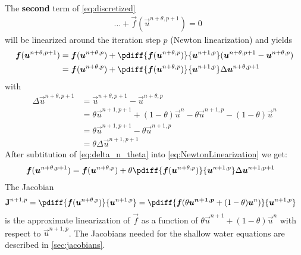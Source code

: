 The \textbf{second} term of \autoref{eq:discretized}
\begin{align}
    &\ldots +
    \vec{f} \left( \vec{u}^{n+\theta, p+1} \right) = 0
    \label{eq:second_term}
\end{align}
%
will be linearized around the iteration step $p$ (Newton linearization) and yields
\begin{align}
    \vec{f}( \vec{u}^{n+\theta, p+1} ) & = \vec{f}( \vec{u}^{n+\theta, p} ) + \pdiff{\vec{f}(\vec{u}^{n+\theta,p})}{\vec{u}^{n+1,p}} (\vec{u}^{n+\theta,p+1} - \vec{u}^{n+\theta,p})
    \\
    & = \vec{f}( \vec{u}^{n+\theta, p} ) + \pdiff{\vec{f}(\vec{u}^{n+\theta,p})}{\vec{u}^{n+1,p}} \Delta\vec{u}^{n+\theta,p+1} \label{eq:NewtonLinearization}
\end{align}
with
\begin{align}
    \Delta \vec{u}^{n+\theta, p+1} & = \vec{u}^{n+\theta, p+1} - \vec{u}^{n+\theta, p}
    \\
    & = \theta \vec{u}^{n+1, p+1} + (1-\theta) \vec{u}^{n} - \theta \vec{u}^{n+1, p} - (1-\theta) \vec{u}^{n}
    \\
    & = \theta \vec{u}^{n+1, p+1} - \theta \vec{u}^{n+1, p}
    \\
    &= \theta \Delta \vec{u}^{n+1, p+1} \label{eq:delta_n_theta}
\end{align}
After subtitution of \autoref{eq:delta_n_theta} into \autoref{eq:NewtonLinearization} we get:
\begin{align}
    \vec{f}( \vec{u}^{n+\theta, p+1} ) & = \vec{f}( \vec{u}^{n+\theta, p} ) + \theta \pdiff{\vec{f}(\vec{u}^{n+\theta,p})}{\vec{u}^{n+1,p}} \Delta \vec{u}^{n+1, p+1}
\end{align}
The Jacobian
\begin{align}
    \mat{J}^{n+1,p} & = \pdiff{\vec{f}(\vec{u}^{n+\theta,p})}{\vec{u}^{n+1,p}}
     = \pdiff{\vec{f}(\theta \vec{u^{n+1,p}} + (1 - \theta) \vec{u}^{n})}{\vec{u}^{n+1,p}}
\end{align}
is the approximate linearization of $\vec{f}$ as a
function of $\theta \vec{u}^{n+1} + (1-\theta)\vec{u}^{n}$ with respect to $\vec{u}^{n+1, p}$.
The Jacobians needed for the shallow water equations are described in \autoref{sec:jacobians}.


